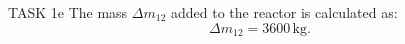 TASK 1e  
The mass \( \Delta m_{12} \) added to the reactor is calculated as:  
\[
\Delta m_{12} = 3600 \, \text{kg}.
\]